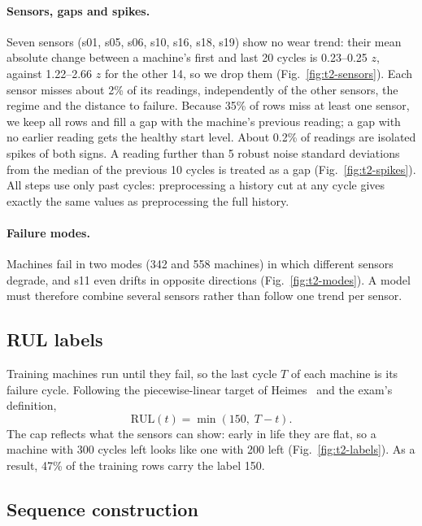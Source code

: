 \paragraph{Sensors, gaps and spikes.} Seven sensors (s01, s05, s06, s10, s16, s18, s19) show no
wear trend: their mean absolute change between a machine's first and last 20 cycles is 0.23--0.25
$z$, against 1.22--2.66 $z$ for the other 14, so we drop them (Fig.~\ref{fig:t2-sensors}). Each
sensor misses about 2\% of its readings, independently of the other sensors, the regime and the
distance to failure. Because 35\% of rows miss at least one sensor, we keep all rows and fill a gap
with the machine's previous reading; a gap with no earlier reading gets the healthy start level.
About 0.2\% of readings are isolated spikes of both signs. A reading further than 5 robust noise
standard deviations from the median of the previous 10 cycles is treated as a gap
(Fig.~\ref{fig:t2-spikes}). All steps use only past cycles: preprocessing a history cut at any cycle
gives exactly the same values as preprocessing the full history.

\paragraph{Failure modes.} Machines fail in two modes (342 and 558 machines) in which different
sensors degrade, and s11 even drifts in opposite directions (Fig.~\ref{fig:t2-modes}). A model must
therefore combine several sensors rather than follow one trend per sensor.

\subsection{RUL labels}
\label{sec:t2-labels}

Training machines run until they fail, so the last cycle $T$ of each machine is its failure cycle.
Following the piecewise-linear target of Heimes~\cite{heimes2008} and the exam's definition,
\[
  \mathrm{RUL}(t) = \min\left(150,\; T - t\right).
\]
The cap reflects what the sensors can show: early in life they are flat, so a machine with 300
cycles left looks like one with 200 left (Fig.~\ref{fig:t2-labels}). As a result, 47\% of the
training rows carry the label 150.

\subsection{Sequence construction}
\label{sec:t2-windows}

